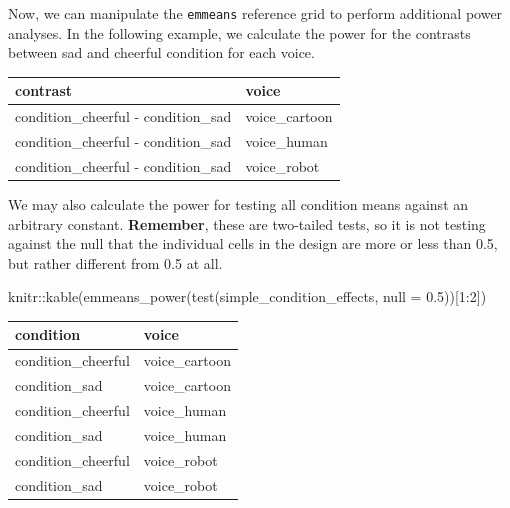 \documentclass[
]{book}
\newenvironment{Shaded}{\begin{snugshade}}{\end{snugshade}}
\newcommand{\AttributeTok}[1]{\textcolor[rgb]{0.77,0.63,0.00}{#1}}
\newcommand{\DecValTok}[1]{\textcolor[rgb]{0.00,0.00,0.81}{#1}}
\newcommand{\FloatTok}[1]{\textcolor[rgb]{0.00,0.00,0.81}{#1}}
\newcommand{\FunctionTok}[1]{\textcolor[rgb]{0.00,0.00,0.00}{#1}}
\newcommand{\NormalTok}[1]{#1}
\newcommand{\OtherTok}[1]{\textcolor[rgb]{0.56,0.35,0.01}{#1}}
\newcommand{\SpecialCharTok}[1]{\textcolor[rgb]{0.00,0.00,0.00}{#1}}
\begin{document}
Now, we can manipulate the \texttt{emmeans} reference grid to perform additional power analyses.
In the following example, we calculate the power for the contrasts between sad and cheerful condition for each voice.

\begin{Shaded}
\end{Shaded}

\begin{tabular}{l|l}
\hline
contrast & voice\\
\hline
condition\_cheerful - condition\_sad & voice\_cartoon\\
\hline
condition\_cheerful - condition\_sad & voice\_human\\
\hline
condition\_cheerful - condition\_sad & voice\_robot\\
\hline
\end{tabular}

We may also calculate the power for testing all condition means against an arbitrary constant. \textbf{Remember}, these are two-tailed tests, so it is not testing against the null that the individual cells in the design are more or less than 0.5, but rather different from 0.5 at all.

\begin{Shaded}
\begin{Highlighting}[]
\NormalTok{knitr}\SpecialCharTok{::}\FunctionTok{kable}\NormalTok{(}\FunctionTok{emmeans\_power}\NormalTok{(}\FunctionTok{test}\NormalTok{(simple\_condition\_effects, }\AttributeTok{null =} \FloatTok{0.5}\NormalTok{))[}\DecValTok{1}\SpecialCharTok{:}\DecValTok{2}\NormalTok{])}
\end{Highlighting}
\end{Shaded}

\begin{tabular}{l|l}
\hline
condition & voice\\
\hline
condition\_cheerful & voice\_cartoon\\
\hline
condition\_sad & voice\_cartoon\\
\hline
condition\_cheerful & voice\_human\\
\hline
condition\_sad & voice\_human\\
\hline
condition\_cheerful & voice\_robot\\
\hline
condition\_sad & voice\_robot\\
\hline
\end{tabular}
\end{document}
